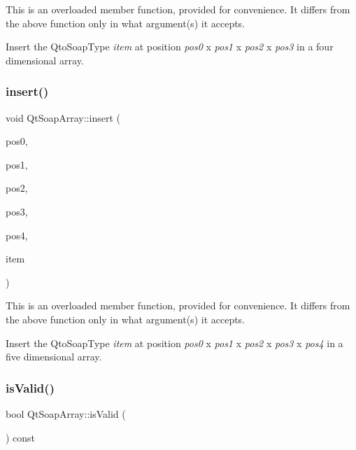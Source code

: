 This is an overloaded member function, provided for convenience. It differs from the above function only in what argument(s) it accepts.

Insert the Qto\+Soap\+Type {\itshape item} at position {\itshape pos0} x {\itshape pos1} x {\itshape pos2} x {\itshape pos3} in a four dimensional array. \mbox{\label{class_qt_soap_array_a27759cc7f9f2d192bba0f5a0283dd9ef}} 
\subsubsection{\texorpdfstring{insert()}{insert()}\hspace{0.1cm}{\footnotesize\ttfamily [5/5]}}
{\footnotesize\ttfamily void Qt\+Soap\+Array\+::insert (\begin{DoxyParamCaption}\item[{int}]{pos0,  }\item[{int}]{pos1,  }\item[{int}]{pos2,  }\item[{int}]{pos3,  }\item[{int}]{pos4,  }\item[{\mbox{\hyperlink{class_qt_soap_type}{Qt\+Soap\+Type}} $\ast$}]{item }\end{DoxyParamCaption})}

This is an overloaded member function, provided for convenience. It differs from the above function only in what argument(s) it accepts.

Insert the Qto\+Soap\+Type {\itshape item} at position {\itshape pos0} x {\itshape pos1} x {\itshape pos2} x {\itshape pos3} x {\itshape pos4} in a five dimensional array. \mbox{\label{class_qt_soap_array_ac74c2b02dd640d9a39dc963753aa10a2}} 
\subsubsection{\texorpdfstring{is\+Valid()}{isValid()}}
{\footnotesize\ttfamily bool Qt\+Soap\+Array\+::is\+Valid (\begin{DoxyParamCaption}{ }\end{DoxyParamCaption}) const\hspace{0.3cm}{\ttfamily [virtual]}}

